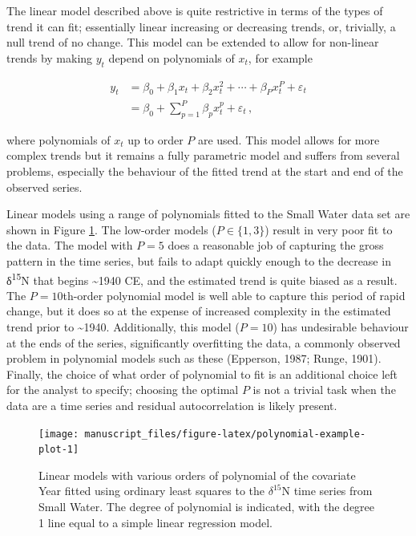 \documentclass[12pt,]{article}
\begin{document}
The linear model described above is quite restrictive in terms of the
types of trend it can fit; essentially linear increasing or decreasing
trends, or, trivially, a null trend of no change. This model can be
extended to allow for non-linear trends by making \(y_t\) depend on
polynomials of \(x_t\), for example

\begin{align} \label{eq:polynomial-model}
y_t &= \beta_0 + \beta_1 x_t + \beta_2 x_t^2 + \cdots + \beta_P x_t^P + \varepsilon_t \\
    &= \beta_0 + \sum_{p = 1}^P \beta_p x_t^p  + \varepsilon_t \,, \nonumber
\end{align}

where polynomials of \(x_t\) up to order \(P\) are used. This model
allows for more complex trends but it remains a fully parametric model
and suffers from several problems, especially the behaviour of the
fitted trend at the start and end of the observed series.

Linear models using a range of polynomials fitted to the Small Water
data set are shown in Figure \ref{fig:polynomial-example-plot}. The
low-order models (\(P \in \{1, 3\}\)) result in very poor fit to the
data. The model with \(P = 5\) does a reasonable job of capturing the
gross pattern in the time series, but fails to adapt quickly enough to
the decrease in δ\textsuperscript{15}N that begins \textasciitilde{}1940
CE, and the estimated trend is quite biased as a result. The
\(P = 10\)th-order polynomial model is well able to capture this period
of rapid change, but it does so at the expense of increased complexity
in the estimated trend prior to \textasciitilde{}1940. Additionally,
this model (\(P = 10\)) has undesirable behaviour at the ends of the
series, significantly overfitting the data, a commonly observed problem
in polynomial models such as these (Epperson, 1987; Runge, 1901).
Finally, the choice of what order of polynomial to fit is an additional
choice left for the analyst to specify; choosing the optimal \(P\) is
not a trivial task when the data are a time series and residual
autocorrelation is likely present.

\begin{figure}

{\centering \texttt{[image: manuscript\_files/figure-latex/polynomial-example-plot-1]} 

}

\caption{Linear models with various orders of polynomial of the covariate Year fitted using ordinary least squares to the $\delta^{15}\text{N}$ time series from Small Water. The degree of polynomial is indicated, with the degree 1 line equal to a simple linear regression model.}\label{fig:polynomial-example-plot}
\end{figure}
\end{document}
